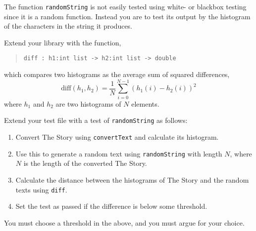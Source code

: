 \label{diff}
The function \lstinline{randomString} is not easily tested using
white- or blackbox testing since it is a random function. Instead
you are to test its output by the histogram of the characters in the
string it produces.

Extend your library with the function,
\begin{quote}
  \mbox{\lstinline!diff : h1:int list -> h2:int list -> double!}
\end{quote}
which compares two histograms as the average sum of squared differences,
\begin{equation}
  \text{diff}(h_1,h_2) = \frac{1}{N}\sum_{i=0}^{N-1}\left(h_1(i) - h_2(i)\right)^2
\end{equation}
where $h_1$ and $h_2$ are two histograms of $N$ elements.

Extend your test file with a test of \lstinline{randomString} as
follows:
\begin{enumerate}
\item Convert The Story using \lstinline{convertText} and calculate
  its histogram.
\item Use this to generate a random text using
  \lstinline{randomString} with length $N$, where $N$ is the length of
  the converted The Story.
\item Calculate the distance between the histograms of The Story and
  the random texts using \lstinline{diff}.
\item Set the test as passed if the difference is below some threshold.
\end{enumerate}
You must choose a threshold in the above, and you must argue for your choice.
